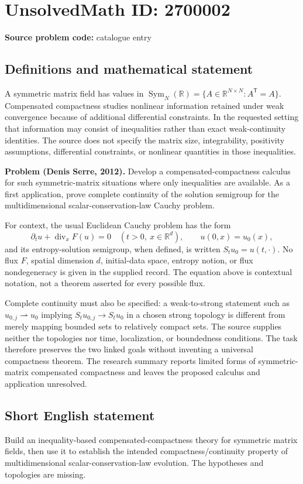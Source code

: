 \documentclass[11pt]{article}
\begin{document}
\section*{UnsolvedMath ID: 2700002}
\textbf{Source problem code:} catalogue entry
\subsection{Definitions and mathematical statement}
A symmetric matrix field has values in $\operatorname{Sym}_N(\mathbb R)=\{A\in\mathbb R^{N\times N}:A^{\mathsf T}=A\}$. Compensated compactness studies nonlinear information retained under weak convergence because of additional differential constraints. In the requested setting that information may consist of inequalities rather than exact weak-continuity identities. The source does not specify the matrix size, integrability, positivity assumptions, differential constraints, or nonlinear quantities in those inequalities.

\textbf{Problem (Denis Serre, 2012).} Develop a compensated-compactness calculus for such symmetric-matrix situations where only inequalities are available. As a first application, prove complete continuity of the solution semigroup for the multidimensional scalar-conservation-law Cauchy problem.

For context, the usual Euclidean Cauchy problem has the form
\[
\partial_tu+\operatorname{div}_xF(u)=0\quad(t>0,\ x\in\mathbb R^d),
\qquad u(0,x)=u_0(x),
\]
and its entropy-solution semigroup, when defined, is written $S_tu_0=u(t,\cdot)$. No flux $F$, spatial dimension $d$, initial-data space, entropy notion, or flux nondegeneracy is given in the supplied record. The equation above is contextual notation, not a theorem asserted for every possible flux.

Complete continuity must also be specified: a weak-to-strong statement such as $u_{0,j}\rightharpoonup u_0$ implying $S_tu_{0,j}\to S_tu_0$ in a chosen strong topology is different from merely mapping bounded sets to relatively compact sets. The source supplies neither the topologies nor time, localization, or boundedness conditions. The task therefore preserves the two linked goals without inventing a universal compactness theorem. The research summary reports limited forms of symmetric-matrix compensated compactness and leaves the proposed calculus and application unresolved.
\subsection{Short English statement}
Build an inequality-based compensated-compactness theory for symmetric matrix fields, then use it to establish the intended compactness/continuity property of multidimensional scalar-conservation-law evolution. The hypotheses and topologies are missing.
\end{document}
